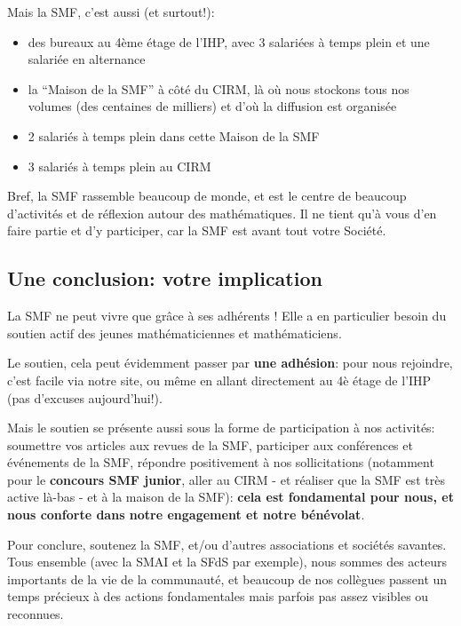 Mais la SMF, c'est aussi (et surtout!):

\begin{itemize} 
 \item des bureaux au 4\`eme \'etage de l'IHP, avec 3 salari\'ees \`a temps plein et une salari\'ee en alternance
\item la ``Maison de la SMF'' \`a c\^ot\'e du CIRM, l\`a o\`u nous stockons tous nos volumes (des centaines de milliers) et d'o\`u la diffusion est organis\'ee
\item 2 salari\'es \`a temps plein dans cette Maison de la SMF
\item 3 salari\'es \`a temps plein au CIRM
\end{itemize}

Bref, la SMF rassemble beaucoup de monde, et est le centre de beaucoup d'activit\'es et de r\'eflexion autour des math\'ematiques. Il ne tient qu'\`a vous d'en faire partie et d'y participer, car la SMF est avant tout votre Soci\'et\'e.

\subsection{Une conclusion: votre implication}


\medskip
\medskip

La SMF ne peut vivre que gr\^ace \`a ses adh\'{e}rents ! Elle a en particulier besoin du soutien actif des jeunes math\'ematiciennes et math\'ematiciens. 

Le soutien, cela peut \'evidemment passer par {\bf une adh\'esion}: pour nous rejoindre, c'est facile via notre site, ou m\^eme en allant directement au 4\`e \'etage de l'IHP (pas d'excuses aujourd'hui!).

Mais le soutien se pr\'esente aussi sous la forme de participation \`a nos activit\'es: soumettre vos articles aux revues de la SMF, participer aux conf\'erences et \'ev\'enements de la SMF, r\'epondre positivement \`a nos sollicitations (notamment pour le {\bf concours SMF junior}, aller au CIRM - et r\'ealiser que la SMF est tr\`es active l\`a-bas - et \`a la maison de la SMF):  {\bf cela est fondamental pour nous, et nous conforte dans  notre engagement et notre b\'en\'evolat}.

Pour conclure, soutenez la SMF, et/ou d'autres associations et soci\'et\'es savantes. Tous ensemble (avec la SMAI et la SFdS par exemple), nous sommes des acteurs importants de la vie de la communaut\'e, et beaucoup de nos coll\`egues passent un temps pr\'ecieux \`a des actions fondamentales mais parfois pas assez visibles ou reconnues.


